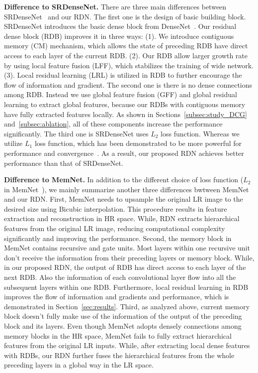 \documentclass[10pt,twocolumn,letterpaper]{article}
\begin{document}
\textbf{Difference to SRDenseNet.} There are three main differences between SRDenseNet~\cite{tong2017image} and our RDN. The first one is the design of basic building block. SRDenseNet introduces the basic dense block from DenseNet~\cite{huang2017densely}. Our residual dense block (RDB) improves it in three ways: (1). We introduce contiguous memory (CM) mechanism, which allows the state of preceding RDB have direct access to each layer of the current RDB. (2). Our RDB allow larger growth rate by using local feature fusion (LFF), which stabilizes the training of wide network. (3). Local residual learning (LRL) is utilized in RDB to further encourage the flow of information and gradient. The second one is there is no dense connections among RDB. Instead we use global feature fusion (GFF) and global residual learning to extract global features, because our RDBs with contiguous memory have fully extracted features locally. As shown in Sections~\ref{subsec:study_DCG} and~\ref{subsec:ablation}, all of these components increase the performance significantly. The third one is SRDenseNet uses $L_2$ loss function. Whereas we utilize $L_1$ loss function, which has been demonstrated to be more powerful for performance and convergence~\cite{lim2017enhanced}. As a result, our proposed RDN achieves better performance than that of SRDenseNet. 

\textbf{Difference to MemNet.} In addition to the different choice of loss function ($L_2$ in MemNet~\cite{tai2017memnet}),  we mainly summarize another three differences bwtween MemNet and our RDN. First, MemNet needs to upsample the original LR image to the desired size using Bicubic interpolation. This procedure results in feature extraction and reconstruction in HR space. While, RDN extracts hierarchical features from the original LR image, reducing computational complexity significantly and improving the performance. Second, the memory block in MemNet contains recursive and gate units. Most layers within one recursive unit don't receive the information from their preceding layers or memory block. While, in our proposed RDN, the output of RDB has direct access to each layer of the next RDB. Also the information of each convolutional layer flow into all the subsequent layers within one RDB. Furthermore, local residual learning in RDB improves the flow of information and gradients and performance, which is demonstrated in Section~\ref{sec:results}. Third, as analyzed above, current memory block doesn't fully make use of the information of the output of the preceding block and its layers. Even though MemNet adopts densely connections among memory blocks in the HR space, MemNet fails to fully extract hierarchical features from the original LR inputs. While, after extracting local dense features with RDBs, our RDN further fuses the hierarchical features from the whole preceding layers in a global way in the LR space. 
          
\end{document}
